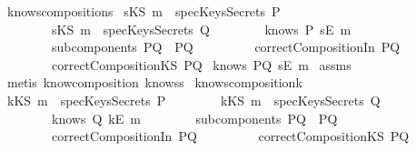 \begin{isabellebody}
{\isafoldproof}%
%
\isadelimproof
\isanewline
%
\endisadelimproof
\isanewline
{}\isamarkupfalse%
\ knows{\isacharunderscore}composition{}{\isacharunderscore}s{\isacharcolon}\isanewline
{}\ {\isachardoublequoteopen}{\isacharparenleft}sKS\ m{\isacharparenright}\ {\isasymnotin}\ specKeysSecrets\ P{\isachardoublequoteclose}\isanewline
\ \ \ \ \ \ \ \ {\isachardoublequoteopen}{\isacharparenleft}sKS\ m{\isacharparenright}\ {\isasymnotin}\ specKeysSecrets\ Q{\isachardoublequoteclose}\isanewline
\ \ \ \ \ \ \ \ {\isachardoublequoteopen}knows\ P\ {\isacharbrackleft}sE\ m{\isacharbrackright}{\isachardoublequoteclose}\isanewline
\ \ \ \ \ \ \ \ {\isachardoublequoteopen}subcomponents\ PQ\ {\isacharequal}\ {\isacharbraceleft}P{\isacharcomma}Q{\isacharbraceright}{\isachardoublequoteclose}\ \isanewline
\ \ \ \ \ \ \ \ {\isachardoublequoteopen}correctCompositionIn\ PQ{\isachardoublequoteclose}\isanewline
\ \ \ \ \ \ \ \ {\isachardoublequoteopen}correctCompositionKS\ PQ{\isachardoublequoteclose}\isanewline
{}\ {\isachardoublequoteopen}knows\ PQ\ {\isacharbrackleft}sE\ m{\isacharbrackright}{\isachardoublequoteclose}\isanewline
%
\isadelimproof
%
\endisadelimproof
%
\isatagproof
{}\isamarkupfalse%
\ assms\ \isamarkupfalse%
\ {\isacharparenleft}metis\ know{\isacharunderscore}composition\ knows{}s{\isacharparenright}%
\endisatagproof
{\isafoldproof}%
%
\isadelimproof
\isanewline
%
\endisadelimproof
\isanewline
{}\isamarkupfalse%
\ knows{\isacharunderscore}composition{}{\isacharunderscore}k{\isacharcolon}\isanewline
{}\ {\isachardoublequoteopen}{\isacharparenleft}kKS\ m{\isacharparenright}\ {\isasymnotin}\ specKeysSecrets\ P{\isachardoublequoteclose}\isanewline
\ \ \ \ \ \ \ \ {\isachardoublequoteopen}{\isacharparenleft}kKS\ m{\isacharparenright}\ {\isasymnotin}\ specKeysSecrets\ Q{\isachardoublequoteclose}\isanewline
\ \ \ \ \ \ \ \ {\isachardoublequoteopen}knows\ Q\ {\isacharbrackleft}kE\ m{\isacharbrackright}{\isachardoublequoteclose}\isanewline
\ \ \ \ \ \ \ \ {\isachardoublequoteopen}subcomponents\ PQ\ {\isacharequal}\ {\isacharbraceleft}P{\isacharcomma}Q{\isacharbraceright}{\isachardoublequoteclose}\isanewline
\ \ \ \ \ \ \ \ {\isachardoublequoteopen}correctCompositionIn\ PQ{\isachardoublequoteclose}\ \isanewline
\ \ \ \ \ \ \ \ {\isachardoublequoteopen}correctCompositionKS\ PQ{\isachardoublequoteclose}\isanewline

\end{isabellebody}
